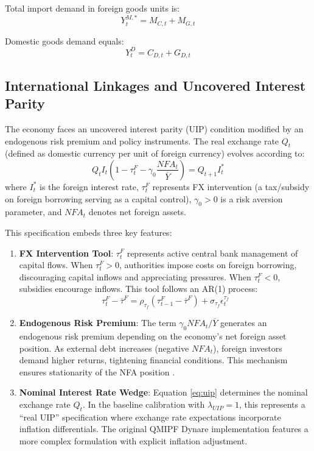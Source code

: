 \documentclass[12pt]{article}
\begin{document}
Total import demand in foreign goods units is:
\begin{equation}
Y_t^{M,*} = M_{C,t} + M_{G,t}
\end{equation}

Domestic goods demand equals:
\begin{equation}
Y_t^D = C_{D,t} + G_{D,t}
\end{equation}

\subsection{International Linkages and Uncovered Interest Parity}\label{sec:uip}

The economy faces an uncovered interest parity (UIP) condition modified by an endogenous risk premium and policy instruments. The real exchange rate $Q_t$ (defined as domestic currency per unit of foreign currency) evolves according to:
\begin{equation}\label{eq:uip}
Q_t I_t \left(1 - \tau_t^F - \gamma_0 \frac{NFA_t}{\overline{Y}} \right) = Q_{t+1} I_t^*
\end{equation}
where $I_t^*$ is the foreign interest rate, $\tau_t^F$ represents FX intervention (a tax/subsidy on foreign borrowing serving as a capital control), $\gamma_0 > 0$ is a risk aversion parameter, and $NFA_t$ denotes net foreign assets.

This specification embeds three key features:
\begin{enumerate}[label=(\roman*)]
\item \textbf{FX Intervention Tool}: $\tau_t^F$ represents active central bank management of capital flows. When $\tau_t^F > 0$, authorities impose costs on foreign borrowing, discouraging capital inflows and appreciating pressures. When $\tau_t^F < 0$, subsidies encourage inflows. This tool follows an AR(1) process:
\begin{equation}
\tau_t^F - \overline{\tau}^F = \rho_{\tau_f} (\tau_{t-1}^F - \overline{\tau}^F) + \sigma_{\tau_f} \epsilon_t^{\tau_f}
\end{equation}

\item \textbf{Endogenous Risk Premium}: The term $\gamma_0 NFA_t / \overline{Y}$ generates an endogenous risk premium depending on the economy's net foreign asset position. As external debt increases (negative $NFA_t$), foreign investors demand higher returns, tightening financial conditions. This mechanism ensures stationarity of the NFA position \citep{schmitt2003closing}.

\item \textbf{Nominal Interest Rate Wedge}: Equation \eqref{eq:uip} determines the nominal exchange rate $Q_t$. In the baseline calibration with $\lambda_{UIP}=1$, this represents a ``real UIP'' specification where exchange rate expectations incorporate inflation differentials. The original QMIPF Dynare implementation features a more complex formulation with explicit inflation adjustment.
\end{enumerate}
\end{document}
